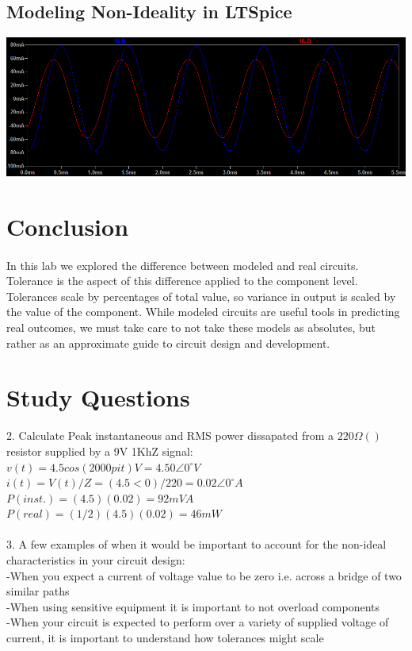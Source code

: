 \documentclass{article}
\begin{document}
\subsection*{Modeling Non-Ideality in LTSpice}
\includegraphics[width=\textwidth]{graph}


\section*{Conclusion}
\paragraph{}
In this lab we explored the difference between modeled and real circuits. Tolerance is the aspect of this difference applied to the component level. Tolerances scale by percentages of total value, so variance in output is scaled by the value of the component. While modeled circuits are useful tools in predicting real outcomes, we must take care to not take these models as absolutes, but rather as an approximate guide to circuit design and development. 

\section*{Study Questions}
2. Calculate Peak instantaneous and RMS power dissapated from a $220\Omega()$ resistor supplied by a 9V 1KhZ signal:
\\
$v(t) = 4.5cos(2000pi t) V = 4.50\angle{}0^\circ{} V$
\\
$i(t) = V(t)/Z = (4.5<0)/220 = 0.02\angle{}0^\circ{} A$
\\
$P(inst.) = (4.5)(0.02) = 92mVA$
\\
$P(real) = (1/2)(4.5)(0.02) = 46mW$
\\
\\
3. A few examples of when it would be important to account for the non-ideal characteristics in your circuit design: 
\\
-When you expect a current of voltage value to be zero i.e. across a bridge of two similar paths
\\
-When using sensitive equipment it is important to not overload components
\\
-When your circuit is expected to perform over a variety of supplied voltage of current, it is important to understand how tolerances might scale


\end{document}

